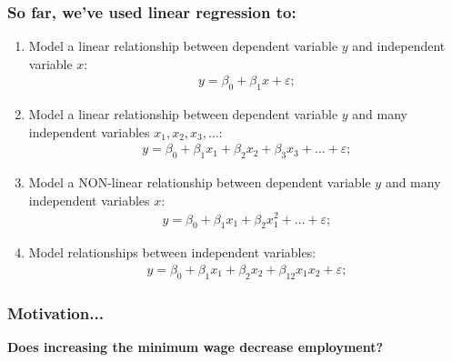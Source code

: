 \documentclass[aspectratio=169]{beamer}
\theoremstyle{principle}
\begin{document}
\begin{frame}
\frametitle{So far, we've used linear regression to:}

\begin{enumerate} 
\item Model a linear relationship between dependent variable $y$ and independent variable $x$:
\begin{align*}
y = \beta_0 + \beta_1x + \varepsilon;
\end{align*}

\item Model a linear relationship between dependent variable $y$ and many independent variables $x_1,x_2,x_3,\hdots$:
\begin{align*}
y = \beta_0 + \beta_1x_1 + \beta_2x_2 + \beta_3x_3 + \hdots + \varepsilon;
\end{align*}

\item Model a NON-linear relationship between dependent variable $y$ and many independent variables $x$:
\begin{align*}
y = \beta_0 + \beta_1x_1 + \beta_2x_1^2 + \hdots + \varepsilon;
\end{align*}

\item Model relationships between independent variables:
\begin{align*}
y = \beta_0 + \beta_1x_1 + \beta_2x_2 + \beta_{12}x_1x_2 + \varepsilon;
\end{align*}

\end{enumerate}

\end{frame}

\begin{frame}
\frametitle{Motivation...}

\begin{center}
\Huge\textbf{Does increasing the minimum wage decrease employment?}\\
\end{center}

\end{frame}
\end{document}
